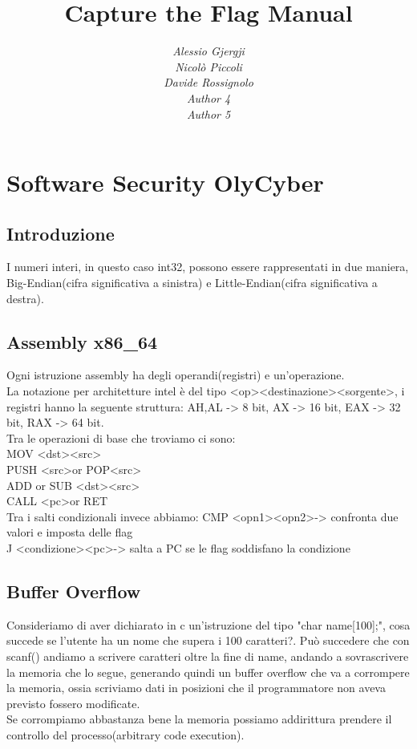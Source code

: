 \documentclass[oneside,a4paper,11pt]{book}
\title{Capture the Flag Manual}
\author{
\textit{Alessio Gjergji}\\
\textit{Nicolò Piccoli} \\
\textit{Davide Rossignolo} \\
\textit{Author 4} \\
\textit{Author 5}}
\date{}
\theoremstyle{italicstyle}
\theoremstyle{normStyle}
\begin{document}
\maketitle
\tableofcontents
\chapter{Software Security OlyCyber}
\section{Introduzione}
I numeri interi, in questo caso int32, possono essere rappresentati in due maniera, Big-Endian(cifra significativa a sinistra) e Little-Endian(cifra significativa a destra).
\section{Assembly x86\_64}
Ogni istruzione assembly ha degli operandi(registri) e un'operazione.\\
La notazione per architetture intel è del tipo \textless op\textgreater\textless destinazione\textgreater\textless sorgente\textgreater, i registri hanno la seguente struttura:
AH,AL -> 8 bit, AX -> 16 bit, EAX -> 32 bit, RAX -> 64 bit.\\
Tra le operazioni di base che troviamo ci sono: \\
MOV \textless dst\textgreater\textless src\textgreater\\
PUSH \textless src\textgreater or POP\textless src\textgreater\\
ADD or SUB \textless dst\textgreater\textless src\textgreater\\
CALL \textless pc\textgreater or RET\\
Tra i salti condizionali invece abbiamo:
CMP \textless opn1\textgreater\textless opn2\textgreater -> confronta due valori e imposta delle flag\\
J \textless condizione\textgreater\textless pc\textgreater -> salta a PC se le flag soddisfano la condizione\\
\section{Buffer Overflow}
Consideriamo di aver dichiarato in c un'istruzione del tipo "char name[100];", cosa succede se l'utente ha un nome che supera i 100 caratteri?.
Può succedere che con scanf() andiamo a scrivere caratteri oltre la fine di name, andando a sovrascrivere la memoria che lo segue, generando quindi un buffer overflow che va a corrompere la memoria, ossia scriviamo dati in posizioni che il programmatore non aveva previsto fossero modificate.\\
Se corrompiamo abbastanza bene la memoria possiamo addirittura prendere il controllo del processo(arbitrary code execution).
\end{document}
